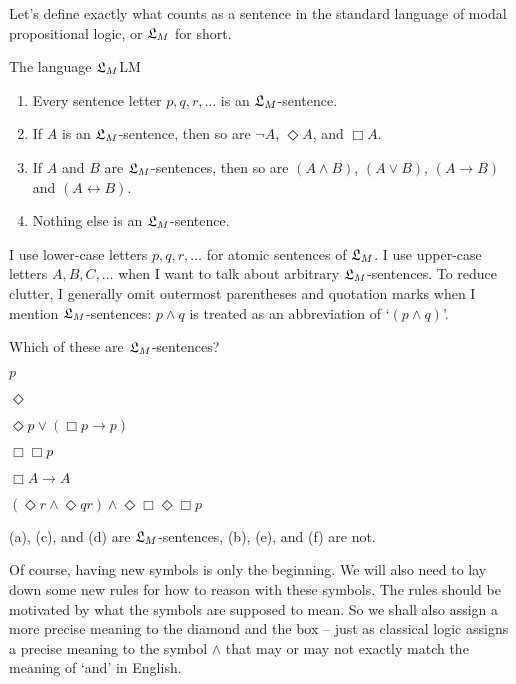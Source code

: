 Let's define exactly what counts as a sentence in the standard language of modal
propositional logic, or $\mathfrak{L}_{M}$ for short.

\begin{definition}{The language $\mathfrak{L}_{M}$}{LM}
  \vspace{-2mm}
\begin{enumerate}[leftmargin=9mm]
  \itemsep-1mm
  \item Every sentence letter $p,q,r,\ldots$ is an $\mathfrak{L}_{M}$-sentence.
  \item If $A$ is an $\mathfrak{L}_M$-sentence, then so are $\neg A$, $\Diamond A$, and   $\Box A$.
  \item If $A$ and $B$ are $\mathfrak{L}_M$-sentences, then so are $(A \land B)$,
  $(A \lor B)$, $(A \to B)$ and $(A \leftrightarrow B)$.
  \item Nothing else is an $\mathfrak{L}_{M}$-sentence.
\end{enumerate}
\end{definition}
%
I use lower-case letters $p,q,r,\ldots$ for atomic sentences of $\mathfrak{L}_{M}$. I use
upper-case letters $A,B,C,\ldots$ when I want to talk about arbitrary
$\mathfrak{L}_{M}$-sentences. To reduce clutter, I generally omit outermost parentheses
and quotation marks when I mention $\mathfrak{L}_{M}$-sentences: $p \land q$ is treated as
an abbreviation of `$(p \land q)$'.

\begin{exercise}
  Which of these are $\mathfrak{L}_M$-sentences?
  \begin{exlist}
  \item $p$
  \item $\Diamond$
  \item $\Diamond p \lor (\Box p \to p)$
  \item $\Box \Box p$
  \item $\Box A \to A$
  \item $(\Diamond r \land \Diamond qr) \land \Diamond \Box\Diamond\Box p$
  \end{exlist}
\end{exercise}
\begin{solution}
  (a), (c), and (d) are $\mathfrak{L}_{M}$-sentences, (b), (e), and (f) are not.
\end{solution}

Of course, having new symbols is only the beginning. We will also need to lay
down some new rules for how to reason with these symbols. The rules should be
motivated by what the symbols are supposed to mean. So we shall also assign a
more precise meaning to the diamond and the box -- just as classical logic
assigns a precise meaning to the symbol $\land$ that may or may not exactly
match the meaning of `and' in English. 

